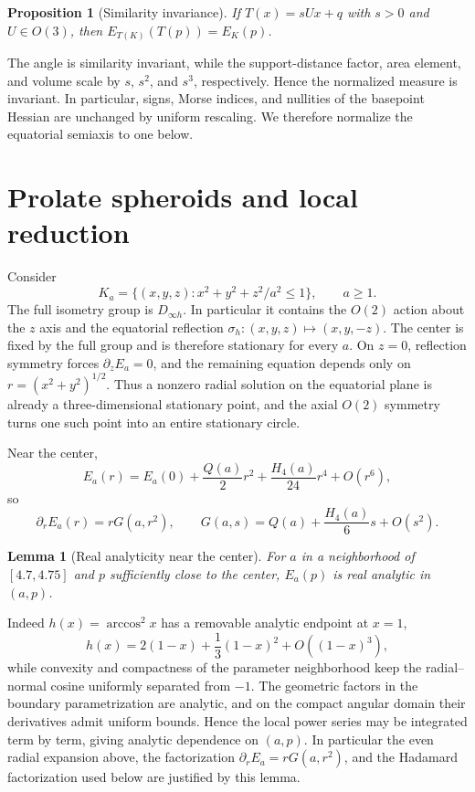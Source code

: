 \documentclass[11pt]{article}
\newtheorem{proposition}[theorem]{Proposition}
\newtheorem{lemma}[theorem]{Lemma}
\begin{document}
\begin{proposition}[Similarity invariance]\label{prop:similarity}
If $T(x)=sUx+q$ with $s>0$ and $U\in O(3)$, then $E_{T(K)}(T(p))=E_K(p)$.
\end{proposition}
The angle is similarity invariant, while the support-distance factor, area element, and volume scale by $s$, $s^2$, and $s^3$, respectively. Hence the normalized measure is invariant. In particular, signs, Morse indices, and nullities of the basepoint Hessian are unchanged by uniform rescaling. We therefore normalize the equatorial semiaxis to one below.

\section{Prolate spheroids and local reduction}
Consider
\[
K_a=\{(x,y,z):x^2+y^2+z^2/a^2\le1\},\qquad a\ge1.
\]
The full isometry group is $D_{\infty h}$. In particular it contains the $O(2)$ action about the $z$ axis and the equatorial reflection $\sigma_h:(x,y,z)\mapsto(x,y,-z)$. The center is fixed by the full group and is therefore stationary for every $a$. On $z=0$, reflection symmetry forces $\partial_zE_a=0$, and the remaining equation depends only on $r=(x^2+y^2)^{1/2}$. Thus a nonzero radial solution on the equatorial plane is already a three-dimensional stationary point, and the axial $O(2)$ symmetry turns one such point into an entire stationary circle.

Near the center,
\[
E_a(r)=E_a(0)+\frac{Q(a)}2r^2+\frac{H_4(a)}{24}r^4+O(r^6),
\]
so
\[
\partial_rE_a(r)=rG(a,r^2),\qquad
G(a,s)=Q(a)+\frac{H_4(a)}6s+O(s^2).
\]
\begin{lemma}[Real analyticity near the center]\label{lem:analyticity}
For $a$ in a neighborhood of $[4.7,4.75]$ and $p$ sufficiently close to the center, $E_a(p)$ is real analytic in $(a,p)$.
\end{lemma}
Indeed $h(x)=\arccos^2x$ has a removable analytic endpoint at $x=1$,
\[
h(x)=2(1-x)+\frac13(1-x)^2+O((1-x)^3),
\]
while convexity and compactness of the parameter neighborhood keep the radial--normal cosine uniformly separated from $-1$. The geometric factors in the boundary parametrization are analytic, and on the compact angular domain their derivatives admit uniform bounds. Hence the local power series may be integrated term by term, giving analytic dependence on $(a,p)$. In particular the even radial expansion above, the factorization $\partial_rE_a=rG(a,r^2)$, and the Hadamard factorization used below are justified by this lemma.
\end{document}
